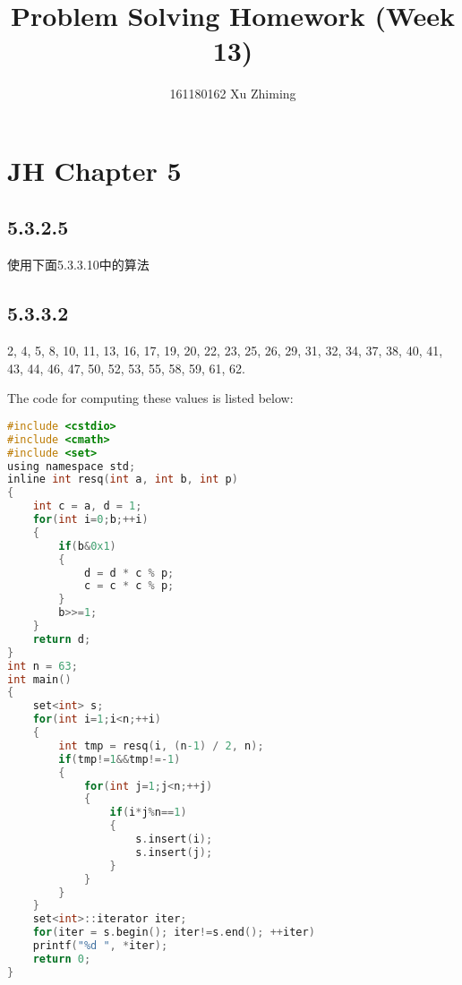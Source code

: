 \documentclass[twocolumn]{article}
\begin{document}
	\title{Problem Solving Homework (Week 13)}\author{161180162 Xu Zhiming}\maketitle
	\section*{JH Chapter 5}
	\subsection*{5.3.2.5}
	使用下面5.3.3.10中的算法
	\subsection*{5.3.3.2}
	2, 4, 5, 8, 10, 11, 13, 16, 17, 19, 20, 22, 23, 25, 26, 29, 31, 32, 34, 37, 38, 40, 41, 43, 44, 46, 47, 50, 52, 53, 55, 58, 59, 61, 62.\par 
	The code for computing these values is listed below:
	\begin{lstlisting}[language=C]
#include <cstdio>
#include <cmath>
#include <set>
using namespace std;
inline int resq(int a, int b, int p)
{
    int c = a, d = 1;
    for(int i=0;b;++i)
    {
        if(b&0x1)
        {
            d = d * c % p;
            c = c * c % p;
        }
        b>>=1;
    }
    return d;
}
int n = 63;
int main()
{
    set<int> s;
    for(int i=1;i<n;++i)
    {
        int tmp = resq(i, (n-1) / 2, n);
        if(tmp!=1&&tmp!=-1)
        {
            for(int j=1;j<n;++j)
            {
                if(i*j%n==1)
                {
                    s.insert(i);
                    s.insert(j);
                }
            }
        }
    }
    set<int>::iterator iter;
    for(iter = s.begin(); iter!=s.end(); ++iter)
    printf("%d ", *iter);
    return 0;
} 
	\end{lstlisting}
\end{document}
